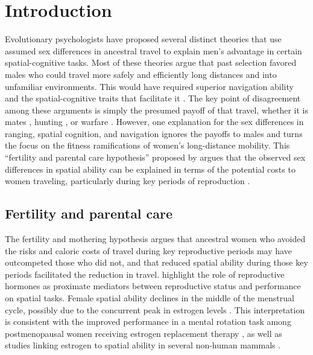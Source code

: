 \section{Introduction}
\label{sec:1}
Evolutionary psychologists have proposed several distinct theories that use assumed sex differences in ancestral travel to explain men's advantage in certain spatial-cognitive tasks.  Most of these theories argue that past selection favored males who could travel more safely and efficiently long distances and into unfamiliar environments.  This would have required superior navigation ability and the spatial-cognitive traits that facilitate it \citep{jones2003evolution}.  The key point of disagreement among these arguments is simply the presumed payoff of that travel, whether it is mates \citep{gaulin1992evolution}, hunting \citep{eals1994hunter}, or warfare \citep{geary1995sexual}.  However, one explanation for the sex differences in ranging, spatial cognition, and navigation ignores the payoffs to males and turns the focus on the fitness ramifications of women's long-distance mobility.  This ``fertility and parental care hypothesis'' proposed by \citet{sherry1997evolution} argues that the observed sex differences in spatial ability can be explained in terms of the potential costs to women traveling, particularly during key periods of reproduction \citep{ecuyer2004have}.

	\subsection{Fertility and parental care}
	\label{sec:1.1}
The fertility and mothering hypothesis argues that ancestral women who avoided the risks and caloric costs of travel during key reproductive periods may have outcompeted those who did not, and that reduced spatial ability during those key periods facilitated  the reduction in travel.  \citet{sherry1997evolution} highlight the role of reproductive hormones as proximate mediators between reproductive status and performance on spatial tasks. Female spatial ability declines in the middle of the menstrual cycle, possibly due to the concurrent peak in estrogen levels \citep{hampson1988reciprocal, hampson1990estrogen, mccormick2001menstrual, komnenich1978gonadal, hausmann2000sex}. This interpretation is consistent with the improved performance in a mental rotation task among postmenopausal women receiving estrogen replacement therapy \citep{duka2000effects}, as well as studies linking estrogen to spatial ability in several non-human mammals \citep{fugger1998sex, lacreuse1999spatial, frye1995estrus}.
	
